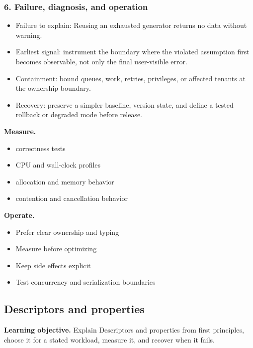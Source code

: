 \subsubsection*{6. Failure, diagnosis, and operation}
\begin{itemize}
\item Failure to explain: Reusing an exhausted generator returns no data without warning.
\item Earliest signal: instrument the boundary where the violated assumption first becomes observable, not only the final user-visible error.
\item Containment: bound queues, work, retries, privileges, or affected tenants at the ownership boundary.
\item Recovery: preserve a simpler baseline, version state, and define a tested rollback or degraded mode before release.
\end{itemize}
\textbf{Measure.}\begin{itemize}
\item correctness tests
\item CPU and wall-clock profiles
\item allocation and memory behavior
\item contention and cancellation behavior
\end{itemize}
\textbf{Operate.}\begin{itemize}
\item Prefer clear ownership and typing
\item Measure before optimizing
\item Keep side effects explicit
\item Test concurrency and serialization boundaries
\end{itemize}
\subsection{Descriptors and properties}
\textbf{Learning objective.} Explain Descriptors and properties from first principles, choose it for a stated workload, measure it, and recover when it fails.
